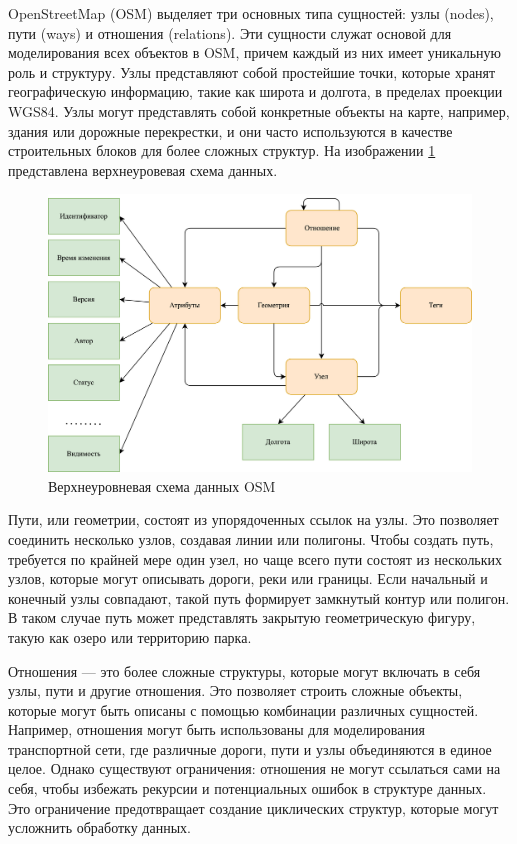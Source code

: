 OpenStreetMap (OSM) выделяет три основных типа сущностей: узлы (nodes), пути (ways) и отношения (relations). Эти сущности служат основой для моделирования всех объектов в OSM, причем каждый из них имеет уникальную роль и структуру. Узлы представляют собой простейшие точки, которые хранят географическую информацию, такие как широта и долгота, в пределах проекции WGS84. Узлы могут представлять собой конкретные объекты на карте, например, здания или дорожные перекрестки, и они часто используются в качестве строительных блоков для более сложных структур. На изображении \ref{fig:osm_data_structure} представлена верхнеуровевая схема данных.

\begin{figure}[H]
	\begin{center}
		\includegraphics[width=0.9\linewidth]{src/img/1/OSM_data_structure.png}
		\caption{Верхнеуровневая схема данных OSM}
		\label{fig:osm_data_structure}
	\end{center}
\end{figure}

Пути, или геометрии, состоят из упорядоченных ссылок на узлы. Это позволяет соединить несколько узлов, создавая линии или полигоны. Чтобы создать путь, требуется по крайней мере один узел, но чаще всего пути состоят из нескольких узлов, которые могут описывать дороги, реки или границы. Если начальный и конечный узлы совпадают, такой путь формирует замкнутый контур или полигон. В таком случае путь может представлять закрытую геометрическую фигуру, такую как озеро или территорию парка.

Отношения — это более сложные структуры, которые могут включать в себя узлы, пути и другие отношения. Это позволяет строить сложные объекты, которые могут быть описаны с помощью комбинации различных сущностей. Например, отношения могут быть использованы для моделирования транспортной сети, где различные дороги, пути и узлы объединяются в единое целое. Однако существуют ограничения: отношения не могут ссылаться сами на себя, чтобы избежать рекурсии и потенциальных ошибок в структуре данных. Это ограничение предотвращает создание циклических структур, которые могут усложнить обработку данных.

